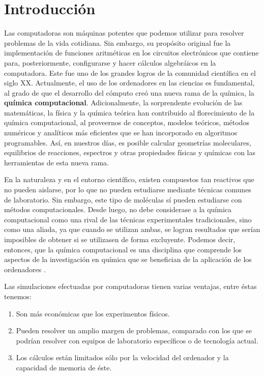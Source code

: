 \documentclass[12pt]{article}
\begin{document}
\newpage

\pagestyle{plain} 

\section*{Introducción}
Las computadoras son máquinas potentes que podemos utilizar para resolver problemas de la vida
cotidiana. Sin embargo, su propósito original fue la implementación de funciones aritméticas
en los circuitos electrónicos que contiene para, posteriormente, configurarse y hacer cálculos
algebráicos en la computadora. Este fue uno de los grandes logros de la comunidad científica en el siglo XX.
Actualmente, el uso de los ordenadores en las ciencias es fundamental, al grado de que el desarrollo
del cómputo creó una nueva rama de la química, la \textbf{química computacional}.
Adicionalmente, la sorprendente evolución de las matemáticas, la física y la química teórica han contribuido al florecimiento de la química computacional, al proveernos de conceptos, modelos
teóricos, métodos numéricos y analíticos más eficientes que se han incorporado en algoritmos
programables. Así, en nuestros días, es posible calcular geometrías moleculares, equilibrios de
reacciones, espectros y otras propiedades físicas y químicas con las herramientas de esta nueva
rama. 

En la naturaleza y en el entorno científico, existen compuestos tan reactivos que no pueden
aislarse, por lo que no pueden estudiarse mediante técnicas comunes de laboratorio. Sin embargo, este tipo de moléculas sí pueden estudiarse con métodos computacionales. Desde luego, no debe considerase a la química computacional como una rival de las técnicas experimentales tradicionales, sino como
una aliada, ya que cuando se utilizan ambas, se logran resultados que serían imposibles de obtener si se utilizasen de forma excluyente. Podemos decir, entonces, que la química computacional es una disciplina que comprende los aspectos de la investigación en química que se benefician de la aplicación de los ordenadores \cite{Cuevas2003}.

Las simulaciones efectuadas por computadoras tienen varias ventajas, entre éstas tenemos:
\begin{enumerate}
\item Son más económicas que los experimentos físicos.
\item Pueden resolver un amplio margen de problemas, comparado con los que se podrían resolver con equipos de laboratorio específicos o de tecnología actual. 
\item Los cálculos están limitados sólo por la velocidad del ordenador y la capacidad de memoria de éste.
\end{enumerate}
\end{document}
